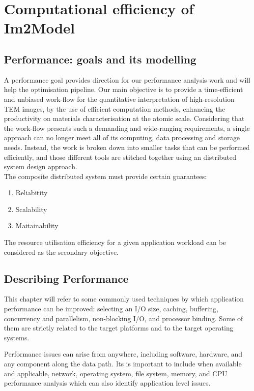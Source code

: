 \documentclass[
  oneside,
  11pt, a4paper,
  footinclude=true,
  headinclude=true,
  cleardoublepage=empty
]{scrbook}
\begin{document}
	\chapter{Computational efficiency of Im2Model}

\section{Performance: goals and its modelling} %


A performance goal provides direction for our performance analysis work and will 
help the optimisation pipeline. Our main objective is to provide a time-efficient and
unbiased work-flow for the quantitative interpretation of high-resolution TEM images, by the use of
efficient computation methods, enhancing the productivity on materials characterisation at the atomic
scale. Considering that the work-flow presents such a demanding and wide-ranging requirements, a single approach can no longer meet all of its computing, data processing and storage needs. 
Instead, the work is broken down into smaller tasks that can be performed efficiently, and those different tools are stitched together using an distributed system design approach.\\

The composite distributed system must provide certain guarantees:

\begin{enumerate}
				    \item Reliabitity
		    \item Scalability
		    \item Maitainability
		\end{enumerate}


The resource utilisation efficiency for a given application workload
can be considered as the secondary objective.\par 





\section{Describing Performance} %

This chapter will refer to some commonly used techniques by which application performance
can be improved: selecting an I/O size, caching, buffering, concurrency
and parallelism, non-blocking I/O, and processor binding. Some of them are strictly related to the target platforms and to the target operating systems. \par 
Performance issues can arise from
anywhere, including software, hardware, and any component along the data path. Its is important to include when available and applicable, network, operating system, file system, memory, and CPU performance analysis which can also identify application level
issues.
\end{document}
